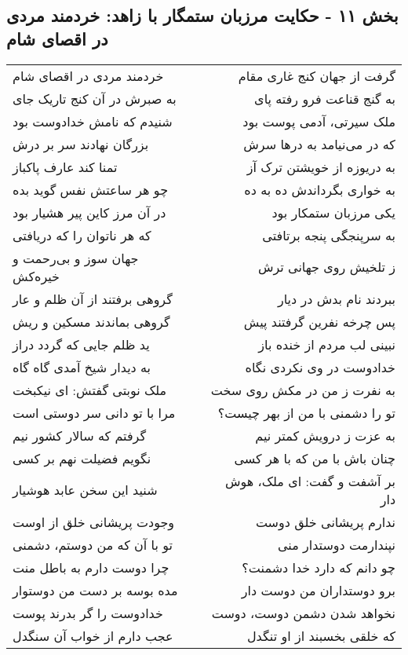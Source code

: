 \begin{center}
\section*{بخش ۱۱ - حکایت مرزبان ستمگار با زاهد: خردمند مردی در اقصای شام}
\label{sec:011}
\begin{longtable}{l p{0.5cm} r}
خردمند مردی در اقصای شام
&&
گرفت از جهان کنج غاری مقام
\\
به صبرش در آن کنج تاریک جای
&&
به گنج قناعت فرو رفته پای
\\
شنیدم که نامش خدادوست بود
&&
ملک سیرتی، آدمی پوست بود
\\
بزرگان نهادند سر بر درش
&&
که در می‌نیامد به درها سرش
\\
تمنا کند عارف پاکباز
&&
به دریوزه از خویشتن ترک آز
\\
چو هر ساعتش نفس گوید بده
&&
به خواری بگرداندش ده به ده
\\
در آن مرز کاین پیر هشیار بود
&&
یکی مرزبان ستمکار بود
\\
که هر ناتوان را که دریافتی
&&
به سرپنجگی پنجه برتافتی
\\
جهان سوز و بی‌رحمت و خیره‌کش
&&
ز تلخیش روی جهانی ترش
\\
گروهی برفتند از آن ظلم و عار
&&
ببردند نام بدش در دیار
\\
گروهی بماندند مسکین و ریش
&&
پس چرخه نفرین گرفتند پیش
\\
ید ظلم جایی که گردد دراز
&&
نبینی لب مردم از خنده باز
\\
به دیدار شیخ آمدی گاه گاه
&&
خدادوست در وی نکردی نگاه
\\
ملک نوبتی گفتش: ای نیکبخت
&&
به نفرت ز من در مکش روی سخت
\\
مرا با تو دانی سر دوستی است
&&
تو را دشمنی با من از بهر چیست؟
\\
گرفتم که سالار کشور نیم
&&
به عزت ز درویش کمتر نیم
\\
نگویم فضیلت نهم بر کسی
&&
چنان باش با من که با هر کسی
\\
شنید این سخن عابد هوشیار
&&
بر آشفت و گفت: ای ملک، هوش دار
\\
وجودت پریشانی خلق از اوست
&&
ندارم پریشانی خلق دوست
\\
تو با آن که من دوستم، دشمنی
&&
نپندارمت دوستدار منی
\\
چرا دوست دارم به باطل منت
&&
چو دانم که دارد خدا دشمنت؟
\\
مده بوسه بر دست من دوستوار
&&
برو دوستداران من دوست دار
\\
خدادوست را گر بدرند پوست
&&
نخواهد شدن دشمن دوست، دوست
\\
عجب دارم از خواب آن سنگدل
&&
که خلقی بخسبند از او تنگدل
\\
\end{longtable}
\end{center}
